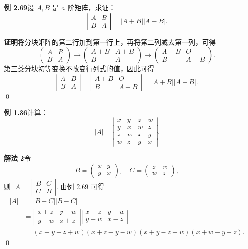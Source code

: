 \documentclass[UTF8, 12pt, fontset=fandol, oneside]{ctexart}
\begin{document}
\noindent\textbf{例 2.69}\quad 设 $A,B$ 是 $n$ 阶矩阵，求证：
\[
\left|
\begin{array}{cc}
A & B\\
B & A
\end{array}
\right|
=|A+B||A-B|.
\]

\noindent\textbf{证明}\quad 将分块矩阵的第二行加到第一行上，再将第二列减去第一列，可得
\[
\left(
\begin{array}{cc}
A & B\\
B & A
\end{array}
\right)
\to
\left(
\begin{array}{cc}
A+B & A+B\\
B & A
\end{array}
\right)
\to
\left(
\begin{array}{cc}
A+B & O\\
B & A-B
\end{array}
\right).
\]
第三类分块初等变换不改变行列式的值，因此可得
\[
\left|
\begin{array}{cc}
A & B\\
B & A
\end{array}
\right|
=
\left|
\begin{array}{cc}
A+B & O\\
B & A-B
\end{array}
\right|
=|A+B||A-B|.
\]
\qed

\noindent\textbf{例 1.36}\quad 计算：
\[
|A|=
\left|
\begin{array}{cccc}
x & y & z & w\\
y & x & w & z\\
z & w & x & y\\
w & z & y & x
\end{array}
\right|.
\]

\noindent\textbf{解法 2}\quad 令
\[
B=
\left(
\begin{array}{cc}
x & y\\
y & x
\end{array}
\right),\quad
C=
\left(
\begin{array}{cc}
z & w\\
w & z
\end{array}
\right),
\]
则 $|A|=
\left|
\begin{array}{cc}
B & C\\
C & B
\end{array}
\right|$. 由例 2.69 可得
\[
\begin{aligned}
|A|
&=|B+C||B-C|\\
&=
\left|
\begin{array}{cc}
x+z & y+w\\
y+w & x+z
\end{array}
\right|
\left|
\begin{array}{cc}
x-z & y-w\\
y-w & x-z
\end{array}
\right|\\
&=(x+y+z+w)(x+z-y-w)(x+y-z-w)(x+w-y-z).
\end{aligned}
\]
\qed
\end{document}
